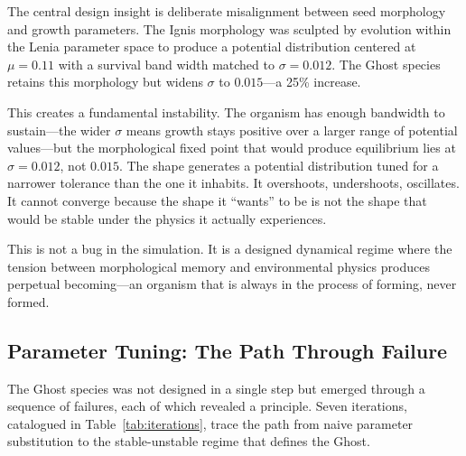 \documentclass[11pt,a4paper]{article}
\begin{document}
The central design insight is deliberate misalignment between seed
morphology and growth parameters. The Ignis morphology was sculpted by
evolution within the Lenia parameter space to produce a potential
distribution centered at $\mu = 0.11$ with a survival band width matched to
$\sigma = 0.012$. The Ghost species retains this morphology but widens
$\sigma$ to $0.015$---a 25\% increase.

This creates a fundamental instability. The organism has enough bandwidth
to sustain---the wider $\sigma$ means growth stays positive over a larger
range of potential values---but the morphological fixed point that would
produce equilibrium lies at $\sigma = 0.012$, not $0.015$. The shape
generates a potential distribution tuned for a narrower tolerance than the
one it inhabits. It overshoots, undershoots, oscillates. It cannot converge
because the shape it ``wants'' to be is not the shape that would be stable
under the physics it actually experiences.

This is not a bug in the simulation. It is a designed dynamical regime
where the tension between morphological memory and environmental physics
produces perpetual becoming---an organism that is always in the process of
forming, never formed.

\subsection{Parameter Tuning: The Path Through Failure}

The Ghost species was not designed in a single step but emerged through a
sequence of failures, each of which revealed a principle. Seven iterations,
catalogued in Table~\ref{tab:iterations}, trace the path from naive
parameter substitution to the stable-unstable regime that defines the
Ghost.
\end{document}
